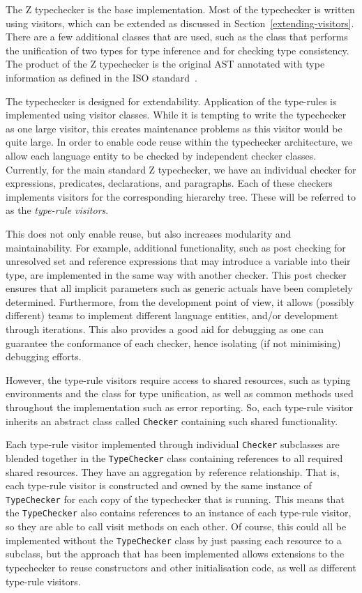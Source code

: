 \documentclass{llncs}
\begin{document}
The Z typechecker is the base implementation. Most of the typechecker
is written using visitors, which can be extended as discussed in
Section~\ref{extending-visitors}. There are a few additional classes
that are used, such as the class that performs the unification of two
types for type inference and for checking type consistency.
The product of the Z typechecker is the original AST annotated with type
information as defined in the ISO standard~\cite[Section~10]{isoz}.

The typechecker is designed for extendability. Application of the type-rules
is implemented using visitor classes. While it is tempting to
write the typechecker as one large visitor, this creates maintenance
problems as this visitor would be quite large.
In order to enable code reuse within the typechecker architecture, we
allow each language entity to be checked by independent checker classes.
Currently, for the main standard Z typechecker, we have an individual checker
for expressions, predicates, declarations, and paragraphs. Each of these checkers
implements visitors for the corresponding hierarchy tree.
These will be referred to as the {\em type-rule visitors}.

This does not only enable reuse, but also increases modularity and maintainability.
For example, additional functionality, such as post checking for unresolved set and
reference expressions that may introduce a variable into their type, are implemented in
the same way with another checker. This post checker ensures that all implicit
parameters such as generic actuals have been completely determined.
Furthermore, from the development point of view, it allows (possibly different) teams
to implement different language entities, and/or development through iterations.
This also provides a good aid for debugging as one can guarantee the conformance of each
checker, hence isolating (if not minimising) debugging efforts.

However, the type-rule visitors require access to shared resources,
such as typing environments and the class for type unification, as well as
common methods used throughout the implementation such as error reporting.
So, each type-rule visitor inherits an abstract class called {\tt Checker}
containing such shared functionality.

Each type-rule visitor implemented through individual {\tt Checker} subclasses
are blended together in the {\tt TypeChecker} class containing references to all
required shared resources. They have an aggregation by reference relationship.
That is, each type-rule visitor is constructed and owned by the same instance of
{\tt TypeChecker} for each copy of the typechecker that is running.
This means that the {\tt TypeChecker} also contains references to an instance
of each type-rule visitor, so they are able to call visit methods on each other.
Of course, this could all be implemented without the {\tt TypeChecker} class by just
passing each resource to a subclass, but the approach that has been implemented allows
extensions to the typechecker to reuse constructors and other initialisation code,
as well as different type-rule visitors.
\end{document}
